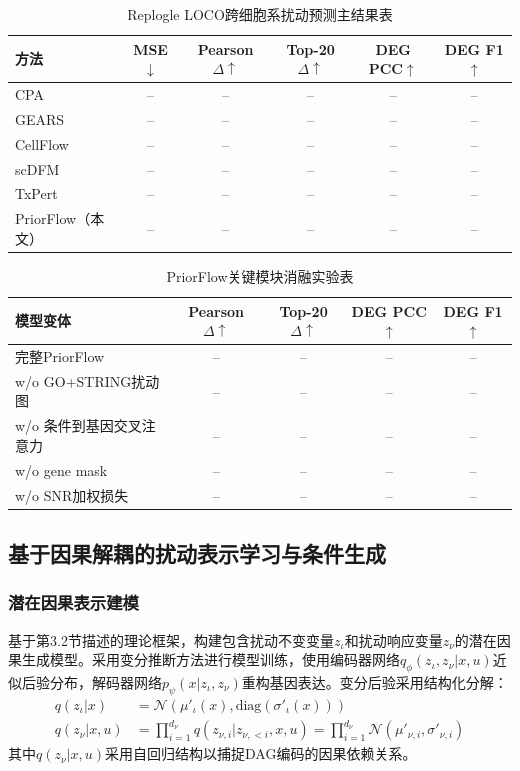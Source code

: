 \begin{table}[ht]
\centering
\small
\caption{Replogle LOCO跨细胞系扰动预测主结果表}
\begin{tabular}{|p{2.7cm}|c|c|c|c|c|}
\hline
\textbf{方法} & \textbf{MSE$\downarrow$} & \textbf{Pearson $\Delta\uparrow$} & \textbf{Top-20 $\Delta\uparrow$} & \textbf{DEG PCC$\uparrow$} & \textbf{DEG F1$\uparrow$} \\
\hline
CPA & -- & -- & -- & -- & -- \\
\hline
GEARS & -- & -- & -- & -- & -- \\
\hline
CellFlow & -- & -- & -- & -- & -- \\
\hline
scDFM & -- & -- & -- & -- & -- \\
\hline
TxPert & -- & -- & -- & -- & -- \\
\hline
PriorFlow（本文） & -- & -- & -- & -- & -- \\
\hline
\end{tabular}
\end{table}

\begin{table}[ht]
\centering
\small
\caption{PriorFlow关键模块消融实验表}
\begin{tabular}{|p{4.2cm}|c|c|c|c|}
\hline
\textbf{模型变体} & \textbf{Pearson $\Delta\uparrow$} & \textbf{Top-20 $\Delta\uparrow$} & \textbf{DEG PCC$\uparrow$} & \textbf{DEG F1$\uparrow$} \\
\hline
完整PriorFlow & -- & -- & -- & -- \\
\hline
w/o GO+STRING扰动图 & -- & -- & -- & -- \\
\hline
w/o 条件到基因交叉注意力 & -- & -- & -- & -- \\
\hline
w/o gene mask & -- & -- & -- & -- \\
\hline
w/o SNR加权损失 & -- & -- & -- & -- \\
\hline
\end{tabular}
\end{table}

\subsection{基于因果解耦的扰动表示学习与条件生成}

\subsubsection{潜在因果表示建模}

基于第3.2节描述的理论框架，构建包含扰动不变变量$z_\iota$和扰动响应变量$z_\nu$的潜在因果生成模型。采用变分推断方法进行模型训练，使用编码器网络$q_\phi(z_\iota, z_\nu | x, u)$近似后验分布，解码器网络$p_\psi(x | z_\iota, z_\nu)$重构基因表达。变分后验采用结构化分解：
\begin{align}
q(z_\iota | x) &= \mathcal{N}(\mu'_\iota(x), \text{diag}(\sigma'_\iota(x))) \\
q(z_\nu | x, u) &= \prod_{i=1}^{d_\nu} q(z_{\nu,i} | z_{\nu,<i}, x, u) = \prod_{i=1}^{d_\nu} \mathcal{N}(\mu'_{\nu,i}, \sigma'_{\nu,i})
\end{align}
其中$q(z_\nu | x, u)$采用自回归结构以捕捉DAG编码的因果依赖关系。


